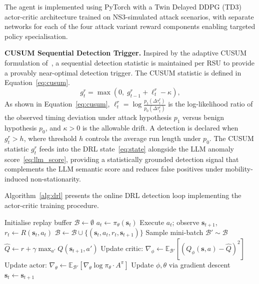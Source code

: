 The agent is implemented using PyTorch with a Twin
Delayed DDPG (TD3) actor-critic architecture trained on NS3-simulated
attack scenarios, with separate networks for each of the four attack
variant reward components enabling targeted policy specialisation.

\textbf{CUSUM Sequential Detection Trigger.}
Inspired by the adaptive CUSUM formulation
of~\cite{llmguardian2026}, a sequential detection statistic is maintained per RSU to
provide a provably near-optimal detection trigger. The CUSUM
statistic is defined in Equation~\eqref{eq:cusum}.
\begin{equation}
g_t^r = \max\!\left(0,\;
  g_{t-1}^r + \ell_t^r - \kappa\right),
\label{eq:cusum}
\end{equation}
As shown in Equation~\eqref{eq:cusum}, $\ell_t^r =
\log\frac{p_1(\Delta\tau_t^r)}{p_0(\Delta\tau_t^r)}$ is
the log-likelihood ratio of the observed timing deviation
under attack hypothesis $p_1$ versus benign hypothesis
$p_0$, and $\kappa > 0$ is the allowable drift. A detection
is declared when $g_t^r > h$, where threshold $h$ controls
the average run length under $p_0$. The CUSUM statistic
$g_t^r$ feeds into the DRL state~\eqref{eq:state} alongside
the LLM anomaly score~\eqref{eq:llm_score}, providing a
statistically grounded detection signal that complements the
LLM semantic score and reduces false positives under
mobility-induced non-stationarity.

Algorithm~\ref{alg:drl} presents the online DRL detection
loop implementing the actor-critic training procedure.

\begin{algorithm}[H]
\caption{DRL-Based Adaptive Detection (\texttt{DRL-Detect})}
\label{alg:drl}
\begin{algorithmic}[1]
\small
{}
  \State Initialise replay buffer $\mathcal{B}\gets\emptyset$
    \State $a_t\gets\pi_\theta(\mathbf{s}_t)$
    \State Execute $a_t$; observe $\mathbf{s}_{t+1}$,
      $r_t\gets R(\mathbf{s}_t,a_t)$
    \State $\mathcal{B}\gets
      \mathcal{B}\cup\{(\mathbf{s}_t,a_t,r_t,
      \mathbf{s}_{t+1})\}$
      \State Sample mini-batch $\mathcal{B}'\sim\mathcal{B}$
      \State $\hat{Q}\gets r+\gamma\max_{a'}
        Q(\mathbf{s}_{t+1},a')$
      \State Update critic: $\nabla_\phi\gets
        \mathbb{E}_{\mathcal{B}'}
        [(Q_\phi(\mathbf{s},a)-\hat{Q})^2]$
      \State Update actor: $\nabla_\theta\gets
        \mathbb{E}_{\mathcal{B}'}
        [\nabla_\theta\log\pi_\theta\cdot A^\pi]$
      \State Update $\phi,\theta$ via gradient descent
    \EndIf
    \State $\mathbf{s}_t\gets\mathbf{s}_{t+1}$
  \EndFor
\EndProcedure
\end{algorithmic}
\end{algorithm}


